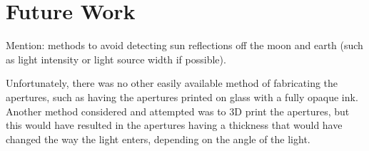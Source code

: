 \chapter{Future Work}
Mention: methods to avoid detecting sun reflections off the moon and earth (such as light intensity or light source width if possible).

Unfortunately, there was no other easily available method of fabricating the apertures, such as having the apertures printed on glass with a fully opaque ink. Another method considered and attempted was to 3D print the apertures, but this would have resulted in the apertures having a thickness that would have changed the way the light enters, depending on the angle of the light.